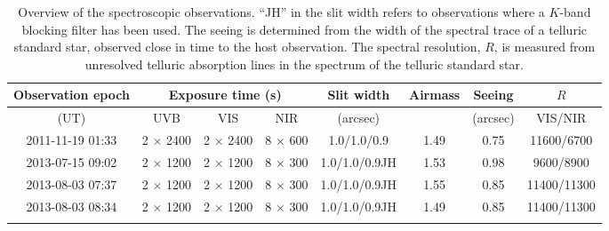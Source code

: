 \begin{table*}[!ht]

	\centering
	\caption{Overview of the spectroscopic observations. ``JH'' in the slit width refers to observations where a $K$-band blocking filter has been used. The seeing is determined from the width of the spectral trace of a telluric standard star, observed close in time to the host observation. The spectral resolution, $R$, is measured from unresolved telluric absorption lines in the spectrum of the telluric standard star. \label{tab:spec_overview}}
	\begin{tabular}{cccccccc}
		\hline\hline
		{Observation epoch} &  \multicolumn{3}{c}{Exposure time (s)} & Slit width & Airmass & Seeing & $R$   \\ [1.5pt]
        \hline
		(UT) & UVB  & VIS & NIR &  (arcsec)   & {} & (arcsec)  & {VIS/NIR}  \\ [1.5pt]
		\hline
		2011-11-19 01:33 & 2 $\times$ 2400 & 2 $\times$ 2400 & 8 $\times$ 600 & 1.0/1.0/0.9 & 1.49 & 0.75 & 11600/6700 \\
        2013-07-15 09:02 & 2 $\times$ 1200 & 2 $\times$ 1200 & 8 $\times$ 300 & 1.0/1.0/0.9JH & 1.53 & 0.98 & 9600/8900 \\
        2013-08-03 07:37 & 2 $\times$ 1200 & 2 $\times$ 1200 & 8 $\times$ 300 & 1.0/1.0/0.9JH & 1.55 & 0.85 & 11400/11300 \\
        2013-08-03 08:34 & 2 $\times$ 1200 & 2 $\times$ 1200 & 8 $\times$ 300 & 1.0/1.0/0.9JH & 1.49 & 0.85 & 11400/11300 \\
		
		\hline\noalign{\smallskip}
		
	\end{tabular}

\end{table*}
